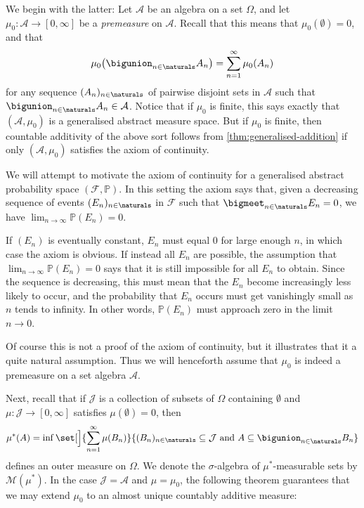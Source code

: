 \documentclass[article, a4paper, 11pt, oneside]{memoir}
\numberwithin{equation}{chapter}
\newcommand{\calF}{\mathcal{F}}
\newcommand{\calA}{\mathcal{A}}
\newcommand{\calJ}{\mathcal{J}}
\newcommand{\calM}{\mathcal{M}}
\renewcommand{\P}{\mathbb{P}}
\begin{document}

We begin with the latter: Let $\calA$ be an algebra on a set $\Omega$, and let $\mu_0 \colon \calA \to [0,\infty]$ be a \emph{premeasure} on $\calA$. Recall that this means that $\mu_0(\emptyset) = 0$, and that
%
\begin{equation*}
    \mu_0 \bigl( \bigunion_{n\in\naturals} A_n \bigr)
        = \sum_{n=1}^\infty \mu_0(A_n)
\end{equation*}
%
for any sequence $(A_n)_{n\in\naturals}$ of pairwise disjoint sets in $\calA$ such that $\bigunion_{n\in\naturals} A_n \in \calA$. Notice that if $\mu_0$ is finite, this says exactly that $(\calA,\mu_0)$ is a generalised abstract measure space. But if $\mu_0$ is finite, then countable additivity of the above sort follows from \cref{thm:generalised-addition} if only $(\calA,\mu_0)$ satisfies the axiom of continuity.

We will attempt to motivate the axiom of continuity for a generalised abstract probability space $(\calF, \P)$. In this setting the axiom says that, given a decreasing sequence of events $(E_n)_{n\in\naturals}$ in $\calF$ such that $\bigmeet_{n\in\naturals} E_n = 0$, we have $\lim_{n\to\infty} \P(E_n) = 0$.

If $(E_n)$ is eventually constant, $E_n$ must equal $0$ for large enough $n$, in which case the axiom is obvious. If instead all $E_n$ are possible, the assumption that $\lim_{n\to\infty} \P(E_n) = 0$ says that it is still impossible for all $E_n$ to obtain. Since the sequence is decreasing, this must mean that the $E_n$ become increasingly less likely to occur, and the probability that $E_n$ occurs must get vanishingly small as $n$ tends to infinity. In other words, $\P(E_n)$ must approach zero in the limit $n \to 0$.

Of course this is not a proof of the axiom of continuity, but it illustrates that it a quite natural assumption. Thus we will henceforth assume that $\mu_0$ is indeed a premeasure on a set algebra $\calA$.

Next, recall that if $\calJ$ is a collection of subsets of $\Omega$ containing $\emptyset$ and $\mu \colon \calJ \to [0,\infty]$ satisfies $\mu(\emptyset) = 0$, then
%
\begin{equation}
    \label{eq:outer-measure}
    \mu^*(A)
        = \inf \set[\Big]{
            \sum_{n=1}^\infty \mu(B_n)
        }{
            (B_n)_{n \in \naturals} \subseteq \calJ
            \text{ and }
            A \subseteq \bigunion_{n \in \naturals} B_n
        }
\end{equation}
%
defines an outer measure on $\Omega$. We denote the $\sigma$-algebra of $\mu^*$-measurable sets by $\calM(\mu^*)$. In the case $\calJ = \calA$ and $\mu = \mu_0$, the following theorem guarantees that we may extend $\mu_0$ to an almost unique countably additive measure:
\end{document}
